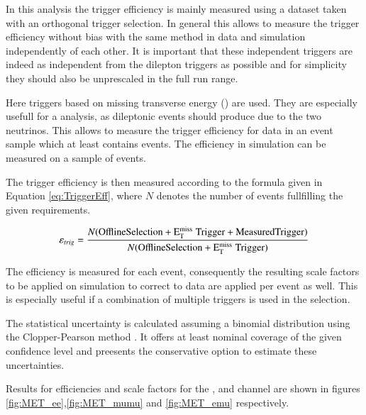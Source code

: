 In this analysis the trigger efficiency is mainly measured using a dataset taken with an orthogonal trigger selection.
In general this allows to measure the trigger efficiency without bias with the same method in data and simulation independently 
of each other. It is important that these independent triggers are indeed as independent from the dilepton triggers as possible
and for simplicity they should also be unprescaled in the full run range.

Here triggers based on missing transverse energy (\ETm) are used. They are especially usefull for a \ttbar analysis, 
as dileptonic \ttbar events should produce \ETm due to the two neutrinos. This allows to measure the trigger efficiency for data
in an event sample which at least contains \ttbar events. The efficiency in simulation can be measured on a sample of \ttbar events.

The trigger efficiency is then measured according to the formula given in Equation \ref{eq:TriggerEff}, where $N$ denotes the number of 
events fullfilling the given requirements.

\begin{equation}
\varepsilon_{trig} = \frac{N(\mathrm{Offline Selection + E_{\mathrm{T}}^{\text{miss}} \; Trigger + Measured Trigger})}{N(\mathrm{Offline Selection + E_{\mathrm{T}}^{\text{miss}} \; Trigger})}
\label{eq:TriggerEff}
\end{equation}

The efficiency is measured for each event, consequently the resulting scale factors to be applied on simulation to correct to data are applied per event as well.
This is especially useful if a combination of multiple triggers is used in the selection.

The statistical uncertainty is calculated assuming a binomial distribution using the Clopper-Pearson method . It offers at least nominal coverage 
of the given confidence level and preesents the conservative option to estimate these uncertainties. 

Results for efficiencies and scale factors for the \ee, \mumu and \emu channel are shown in figures \ref{fig:MET_ee},\ref{fig:MET_mumu} and \ref{fig:MET_emu} respectively.

